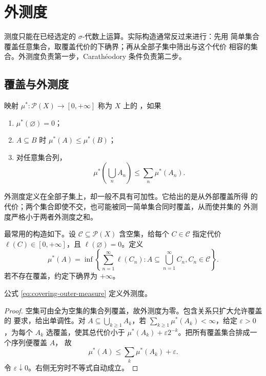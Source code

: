 \chapter{外测度}
\label{chap:outer-measures}

测度只能在已经选定的 $\sigma$-代数上运算。实际构造通常反过来进行：先用
简单集合覆盖任意集合，取覆盖代价的下确界；再从全部子集中筛出与这个代价
相容的集合。外测度负责第一步，Carathéodory 条件负责第二步。

\section{覆盖与外测度}

\begin{definition}
映射 $\mu^*:\mathcal P(X)\to[0,+\infty]$ 称为 $X$ 上的
，如果
\begin{enumerate}[label=\textup{(\roman*)}]
 \item $\mu^*(\varnothing)=0$；
 \item $A\subseteq B$ 时 $\mu^*(A)\le\mu^*(B)$；
 \item 对任意集合列，
 \[
  \mu^*\!\left(\bigcup_nA_n\right)\le\sum_n\mu^*(A_n).
 \]
\end{enumerate}
\end{definition}

外测度定义在全部子集上，却一般不具有可加性。它给出的是从外部覆盖所得
的代价；两个集合即使不交，也可能被同一简单集合同时覆盖，从而使并集的
外测度严格小于两者外测度之和。

最常用的构造如下。设 $\mathcal C\subseteq\mathcal P(X)$ 含空集，给每个
$C\in\mathcal C$ 指定代价 $\ell(C)\in[0,+\infty]$，且
$\ell(\varnothing)=0$。定义
\begin{equation}
 \mu^*(A)=\inf\left\{\sum_{n=1}^{\infty}\ell(C_n):
 A\subseteq\bigcup_{n=1}^{\infty}C_n, C_n\in\mathcal C\right\}.
 \label{eq:covering-outer-measure}
\end{equation}
若不存在覆盖，约定下确界为 $+\infty$。

\begin{proposition}
公式 \eqref{eq:covering-outer-measure} 定义外测度。
\end{proposition}

\begin{proof}
空集可由全为空集的集合列覆盖，故外测度为零。包含关系只扩大允许覆盖的
要求，给出单调性。对 $A\subseteq\bigcup_{k\ge1}A_k$，若
$\sum_{k\ge1}\mu^*(A_k)<\infty$，给定
$\varepsilon>0$，为每个 $A_k$ 选覆盖，使其总代价小于
$\mu^*(A_k)+\varepsilon2^{-k}$。把所有覆盖集合排成一个序列便覆盖 $A$，
故
\[
 \mu^*(A)\le\sum_k\mu^*(A_k)+\varepsilon.
\]
令 $\varepsilon\downarrow0$。右侧无穷时不等式自动成立。
\end{proof}

